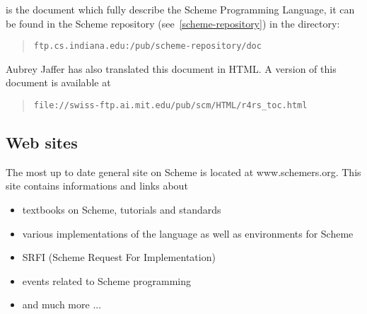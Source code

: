 {\rrrr}{} is the document which fully describe the Scheme
Programming Language, it can be found in the Scheme repository
(see~\ref{scheme-repository}) in the directory:
\begin{quote}
{\tt ftp.cs.indiana.edu:/pub/scheme-repository/doc}
\end{quote}

Aubrey Jaffer has also translated this document in HTML. A version of this 
document is available at
\begin{quote}
{\tt file://swiss-ftp.ai.mit.edu/pub/scm/HTML/r4rs\_toc.html}
\end{quote}

\subsection{Web sites}

The most up to date general site on Scheme is located at
www.schemers.org. This site contains informations
and links about
\begin{itemize}
\item textbooks on Scheme, tutorials and standards
\item various implementations of the language as well as environments for Scheme
\item SRFI (Scheme Request For Implementation) 
\item events related to Scheme programming 
\item and much more ...
\end{itemize}

